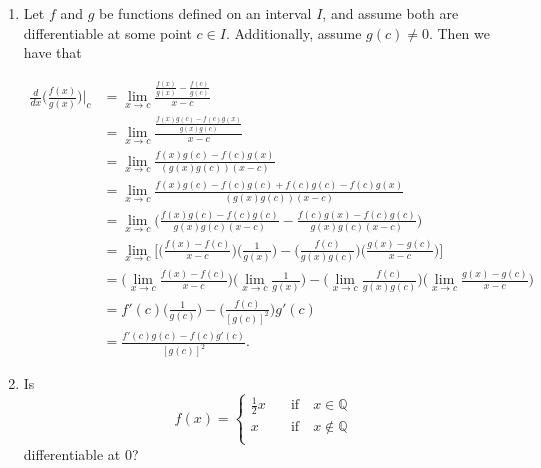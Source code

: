 \documentclass[12pt]{article}
\makeatletter
\theoremstyle{definition}
\theoremstyle{remark}
\renewenvironment{proof}[1][\proofname]{\par
  \pushQED{\qed}%
  \normalfont \topsep6\p@\@plus6\p@\relax
  \list{}{\leftmargin=0mm
          \rightmargin=0mm
          \settowidth{\itemindent}{\itshape#1}%
          \labelwidth=\itemindent
          \parsep=0pt \listparindent=\parindent 
  }
  \item[\hskip\labelsep
        \itshape
    #1\@addpunct{.}]\ignorespaces
}{%
  \popQED\endlist\@endpefalse
}
\let\oldproofname=\proofname
\renewcommand{\proofname}{\bf{\textit{\oldproofname}}}
\makeatother
\begin{document}
\begin{enumerate}[leftmargin=*]
    \begin{proof}
        Let $f$ and $g$ be functions defined on an interval $I$, and assume both are differentiable at some point $c\in I$. Additionally, assume $g(c)\neq 0$. Then we have that
        
        \begin{equation*}
            \begin{split}
                \frac{d}{dx}\bigg(\frac{f(x)}{g(x)}\bigg)\Bigr|_c &= \lim_{x\rightarrow c} \frac{\frac{f(x)}{g(x)}-\frac{f(c)}{g(c)}}{x-c} \\
                &= \lim_{x\rightarrow c}\frac{\frac{f(x)g(c)-f(c)g(x)}{g(x)g(c)}}{x-c} \\
                &= \lim_{x\rightarrow c}\frac{f(x)g(c)-f(c)g(x)}{(g(x)g(c))(x-c)} \\
                &= \lim_{x\rightarrow c}\frac{f(x)g(c)-f(c)g(c)+f(c)g(c)-f(c)g(x)}{(g(x)g(c))(x-c)} \\
                &= \lim_{x\rightarrow c}\bigg(\frac{f(x)g(c)-f(c)g(c)}{g(x)g(c)(x-c)}-\frac{f(c)g(x)-f(c)g(c)}{g(x)g(c)(x-c)}\bigg) \\
                &= \lim_{x\rightarrow c}\bigg[\bigg(\frac{f(x)-f(c)}{x-c}\bigg)\bigg(\frac{1}{g(x)}\bigg)-\bigg(\frac{f(c)}{g(x)g(c)}\bigg)\bigg(\frac{g(x)-g(c)}{x-c}\bigg)\bigg] \\
                &= \bigg(\lim_{x\rightarrow c}\frac{f(x)-f(c)}{x-c}\bigg)\bigg(\lim_{x\rightarrow c}\frac{1}{g(x)}\bigg)-\bigg(\lim_{x\rightarrow c}\frac{f(c)}{g(x)g(c)}\bigg)\bigg(\lim_{x\rightarrow c}\frac{g(x)-g(c)}{x-c}\bigg) \\
                &= f'(c)\bigg(\frac{1}{g(c)}\bigg)-\bigg(\frac{f(c)}{[g(c)]^2}\bigg)g'(c) \\
                &= \frac{f'(c)g(c)-f(c)g'(c)}{[g(c)]^2}.
            \end{split}
        \end{equation*}
    \end{proof}
    
    \item Is
        \begin{equation*}
            f(x)=
            \begin{cases} 
                \frac{1}{2}x & \quad\text{if}\quad x\in\mathbb{Q} \\
                x & \quad\text{if}\quad x\notin\mathbb{Q} \\
            \end{cases}
        \end{equation*}
        differentiable at 0?
        

\end{enumerate}
\end{document}
